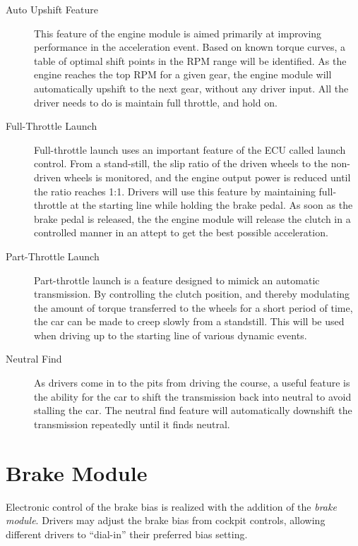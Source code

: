 \begin{description}

\item[Auto Upshift Feature]
This feature of the engine module is aimed primarily at improving performance in the acceleration event. Based on known torque curves, a table of optimal shift points in the RPM range will be identified. As the engine reaches the top RPM for a given gear, the engine module will automatically upshift to the next gear, without any driver input. All the driver needs to do is maintain full throttle, and hold on.

\item[Full-Throttle Launch]
Full-throttle launch uses an important feature of the ECU called launch control. From a stand-still, the slip ratio of the driven wheels to the non-driven wheels is monitored, and the engine output power is reduced until the ratio reaches 1:1. Drivers will use this feature by maintaining full-throttle at the starting line while holding the brake pedal. As soon as the brake pedal is released, the the engine module will release the clutch in a controlled manner in an attept to get the best possible acceleration.

\item[Part-Throttle Launch]
Part-throttle launch is a feature designed to mimick an automatic transmission. By controlling the clutch position, and thereby modulating the amount of torque transferred to the wheels for a short period of time, the car can be made to creep slowly from a standstill. This will be used when driving up to the starting line of various dynamic events.

\item[Neutral Find]
As drivers come in to the pits from driving the course, a useful feature is the ability for the car to shift the transmission back into neutral to avoid stalling the car. The neutral find feature will automatically downshift the transmission repeatedly until it finds neutral.

\end{description}

%
%

\section{Brake Module}

Electronic control of the brake bias is realized with the addition of the \emph{brake module}. Drivers may adjust the brake bias from cockpit controls, allowing different drivers to {}``dial-in'' their preferred bias setting.

